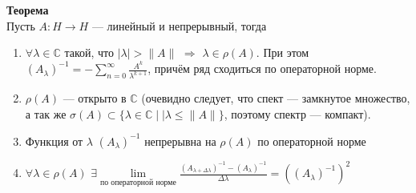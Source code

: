 \documentclass[12pt]{article}
\begin{document}
\textbf{Теорема}\\
Пусть $A : H \to H$ --- линейный и непрерывный, тогда
\begin{enumerate}
    \item{$\forall \lambda \in \mathbb C$ такой, что $|\lambda| > \|A\|$ $\Rightarrow$ $\lambda \in \rho(A)$.
        При этом $(A_\lambda)^{-1} = -\sum \limits_{n = 0}^{\infty}\frac{A^k}{\lambda^{k+1}}$, причём ряд сходиться по операторной норме.}
    \item{$\rho(A)$ --- открыто в $\mathbb C$ (очевидно следует, что спект --- замкнутое множество, а так же $\sigma(A) \subset \{ \lambda \in \mathbb C \mid |\lambda
        \le \|A\|\}$, поэтому спектр --- компакт).}
    \item{Функция от $\lambda$ $(A_\lambda)^{-1}$ непрерывна на $\rho(A)$ по операторной норме}
    \item{$\forall \lambda \in \rho(A)$ $\exists \lim\limits_{\text{по операторной норме}}\frac{(A_{\lambda + \Delta \lambda})^{-1} - (A_\lambda)^{-1}}{\Delta\lambda} =
        ((A_\lambda)^{-1})^2$}
\end{enumerate}
\end{document}
